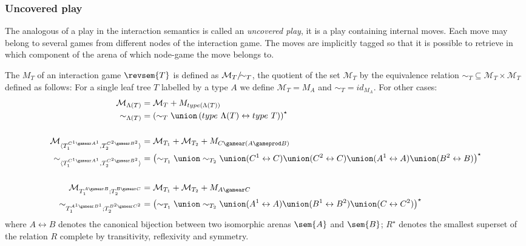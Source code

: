 \subsubsection{Uncovered play}

The analogous of a play in the interaction semantics is called an
\emph{uncovered play}, it is a play containing internal moves. Each move may belong to several games
from different nodes of the interaction game.
The moves are implicitly tagged so that it is possible to retrieve in
which component of the arena of which node-game the move belongs to.

\begin{definition}
The  $M_T$ of an interaction game
$\revsem{T}$ is defined as $\mathcal{M}_T/\hspace{-0.5em}\sim_T$,
the quotient of the set $\mathcal{M}_T$ by the equivalence relation
$\sim_T \subseteq \mathcal{M}_T \times \mathcal{M}_T$ defined as follows:
For a single leaf tree $T$ labelled by a type $A$ we define
$\mathcal{M}_T = M_A$ and $\sim_T = id_{M_A}$. For other cases:
    \begin{align*}
        \mathcal{M}_{\Lambda(T)} &= \mathcal{M}_{T} + M_{type(\Lambda(T))}
    \\
        \sim_{\Lambda(T)} &= \left( \sim_{T}
        \union \left(type\ \Lambda(T) \leftrightarrow type\ T\right)
        \right)^\star
    \\
    \\
        \mathcal{M}_{\langle T_1^{C^1 \gamear A^1}, T_2^{C^2 \gamear B^2}\rangle}
        &= \mathcal{M}_{T_1} + \mathcal{M}_{T_2} + M_{C \gamear (A \gameprod B)}
    \\
         \sim_{\langle T_1^{C^1 \gamear A^1}, T_2^{C^2 \gamear B^2}\rangle} &= \left( \sim_{T_1}
        \union \sim_{T_2} \union (C^1 \leftrightarrow C) \union (C^2 \leftrightarrow C)
        \union (A^1 \leftrightarrow A) \union (B^2 \leftrightarrow B)
        \right)^\star
    \\
    \\
        \mathcal{M}_{T_1^{A \gamear B};T_2^{B \gamear C}} &=
            \mathcal{M}_{T_1} + \mathcal{M}_{T_2} + M_{A\gamear C}
        \\
         \sim_{T_1^{A^1 \gamear B^1};T_2^{B^2 \gamear C^2}} &= \left( \sim_{T_1}
        \union \sim_{T_2} \union (A^1 \leftrightarrow A)
        \union (B^1 \leftrightarrow B^2) \union (C \leftrightarrow C^2)
        \right)^\star
    \end{align*}
    where $A\leftrightarrow B$ denotes the canonical bijection between two isomorphic arenas $\sem{A}$ and $\sem{B}$; $R^\star$ denotes the smallest superset of the relation $R$ complete by transitivity, reflexivity and symmetry.
\end{definition}

